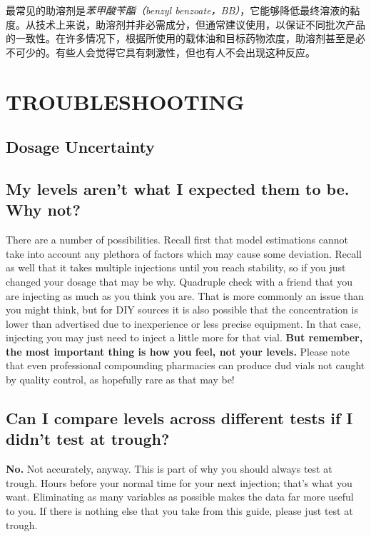 \documentclass{article}
\begin{document}
最常见的助溶剂是\textit{苯甲酸苄酯（benzyl benzoate，BB）}，它能够降低最终溶液的黏度。从技术上来说，助溶剂并非必需成分，但通常建议使用，以保证不同批次产品的一致性。在许多情况下，根据所使用的载体油和目标药物浓度，助溶剂甚至是必不可少的。有些人会觉得它具有刺激性，但也有人不会出现这种反应。

\section{TROUBLESHOOTING}

\subsection*{Dosage Uncertainty}

\subsection{My levels aren’t what I expected them to be. Why not?}

There are a number of possibilities. Recall first that model estimations cannot take into account any plethora of factors which may cause some deviation. Recall as well that it takes multiple injections until you reach stability, so if you just changed your dosage that may be why. Quadruple check with a friend that you are injecting as much as you think you are. That is more commonly an issue than you might think, but for DIY sources it is also possible that the concentration is lower than advertised due to inexperience or less precise equipment. In that case, injecting you may just need to inject a little more for that vial. \textbf{But remember, the most important thing is how you feel, not your levels.} Please note that even professional compounding pharmacies can produce dud vials not caught by quality control, as hopefully rare as that may be!

\subsection{Can I compare levels across different tests if I didn’t test at trough?}

\textbf{No.} Not accurately, anyway. This is part of why you should always test at trough. Hours before your normal time for your next injection; that’s what you want. Eliminating as many variables as possible makes the data far more useful to you. If there is nothing else that you take from this guide, please just test at trough.
\end{document}
